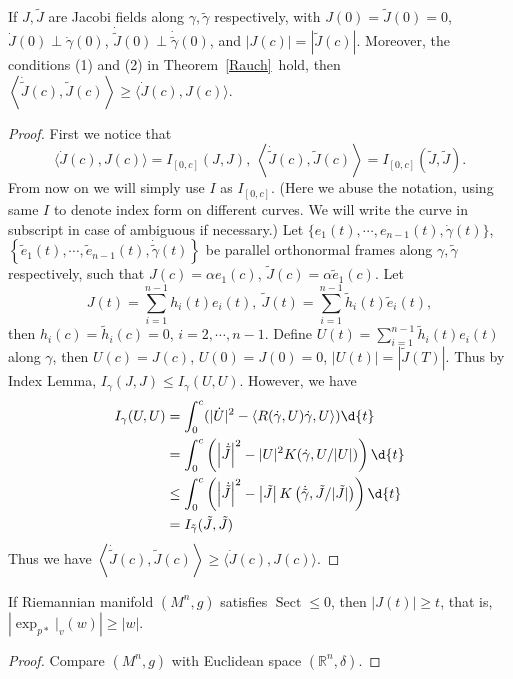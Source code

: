 \begin{lem}
    If $J,\tilde{J}$ are Jacobi fields along $\gamma,\tilde{\gamma}$ respectively, with $J(0)=\tilde{J}(0)=0$, $\dot{J}(0)\perp\dot{\gamma}(0)$, $\dot{\tilde{J}}(0)\perp\dot{\tilde{\gamma}}(0)$, and $|J(c)|=|\tilde{J}(c)|$.
    Moreover, the conditions (1) and (2) in Theorem~\ref{Rauch}~hold, then $\left\langle\dot{\tilde{J}}(c),\tilde{J}(c)\right\rangle\geq\langle\dot{J}(c),J(c)\rangle$.
\end{lem}
\begin{proof}
    First we notice that
    \[\langle\dot{J}(c),J(c)\rangle=I_{[0,c]}(J,J),\ \left\langle\dot{\tilde{J}}(c),\tilde{J}(c)\right\rangle=I_{[0,c]}\left(\tilde{J},\tilde{J}\right).\]
    From now on we will simply use $I$ as $I_{[0,c]}$.
    (Here we abuse the notation, using same $I$ to denote index form on different curves.
    We will write the curve in subscript in case of ambiguous if necessary.)
    Let $\{e_1(t),\cdots,e_{n-1}(t),\dot{\gamma}(t)\}$, $\left\{\tilde{e}_1(t),\cdots,\tilde{e}_{n-1}(t),\dot{\tilde{\gamma}}(t)\right\}$ be parallel orthonormal frames along $\gamma,\tilde{\gamma}$ respectively, such that $J(c)=\alpha e_1(c)$, $\tilde{J}(c)=\alpha\tilde{e}_1(c)$.
    Let
    \[J(t)=\sum_{i=1}^{n-1}h_i(t)e_i(t),\ \tilde{J}(t)=\sum_{i=1}^{n-1}\tilde{h}_i(t)\tilde{e}_i(t),\]
    then $h_i(c)=\tilde{h}_i(c)=0$, $i=2,\cdots,n-1$.
    Define $U(t)=\sum_{i=1}^{n-1}\tilde{h}_i(t)e_i(t)$ along $\gamma$, then $U(c)=J(c)$, $U(0)=J(0)=0$, $|U(t)|=|\tilde{J}(T)|$.
    Thus by Index Lemma, $I_\gamma(J,J)\leq I_\gamma(U,U)$.
    However, we have
    \begin{align*}
        I_\gamma(U,U)&=\int_0^c(|\dot{U}|^2-\langle R(\dot{\gamma},U)\dot{\gamma},U\rangle)\d{t}\\
        &=\int_0^c\left(\left|\dot{\tilde{J}}\right|^2-|U|^2K(\dot{\gamma},U/|U|)\right)\d{t}\\
        &\leq\int_0^c\left(\left|\dot{\tilde{J}}\right|^2-\left|\tilde{J}\right|K\left(\dot{\tilde{\gamma}},\tilde{J}/|\tilde{J}|\right)\right)\d{t}\\
        &=I_{\tilde{\gamma}}(\tilde{J},\tilde{J})
    \end{align*}
    Thus we have $\left\langle\dot{\tilde{J}}(c),\tilde{J}(c)\right\rangle\geq\langle\dot{J}(c),J(c)\rangle$.
\end{proof}

\begin{cor}
    If Riemannian manifold $(M^n,g)$ satisfies $\operatorname{Sect}\leq 0$, then $|J(t)|\geq t$, that is, $\left|\exp_{p*}|_v(w)\right|\geq|w|$.
\end{cor}
\begin{proof}
    Compare $(M^n,g)$ with Euclidean space $(\mathbb{R}^n,\delta)$.
\end{proof}


